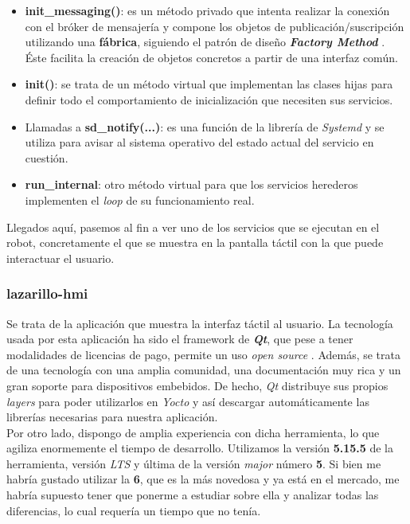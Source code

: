 \begin{itemize}
	\item \textbf{init\_messaging()}: es un método privado que intenta realizar la conexión con el bróker de mensajería y compone los objetos de publicación/suscripción utilizando una \textbf{fábrica}, siguiendo el patrón de diseño \textbf{\textit{Factory Method}} \cite{factory-method}. Éste facilita la creación de objetos concretos a partir de una interfaz común.
	\item \textbf{init()}: se trata de un método virtual que implementan las clases hijas para definir todo el comportamiento de inicialización que necesiten sus servicios.
	\item Llamadas a \textbf{sd\_notify(...)}: es una función de la librería de \textit{Systemd} y se utiliza para avisar al sistema operativo del estado actual del servicio en cuestión.
	\item \textbf{run\_internal}: otro método virtual para que los servicios herederos implementen el \textit{loop} de su funcionamiento real. 
\end{itemize}

Llegados aquí, pasemos al fin a ver uno de los servicios que se ejecutan en el robot, concretamente el que se muestra en la pantalla táctil con la que puede interactuar el usuario.\\


\subsubsection{lazarillo-hmi}

Se trata de la aplicación que muestra la interfaz táctil al usuario. La tecnología usada por esta aplicación ha sido el framework de \textbf{\textit{Qt}}, que pese a tener modalidades de licencias de pago, permite un uso \textit{open source} \cite{qt-open-source}. Además, se trata de una tecnología con una amplia comunidad, una documentación muy rica y un gran soporte para dispositivos embebidos. De hecho, \textit{Qt} distribuye sus propios \textit{layers} para poder utilizarlos en \textit{Yocto} y así descargar automáticamente las librerías necesarias para nuestra aplicación.\\

Por otro lado, dispongo de amplia experiencia con dicha herramienta, lo que agiliza enormemente el tiempo de desarrollo. Utilizamos la versión \textbf{5.15.5} de la herramienta, versión \textit{LTS} y última de la versión \textit{major} número \textbf{5}. Si bien me habría gustado utilizar la \textbf{6}, que es la más novedosa y ya está en el mercado, me habría supuesto tener que ponerme a estudiar sobre ella y analizar todas las diferencias, lo cual requería un tiempo que no tenía.\\

